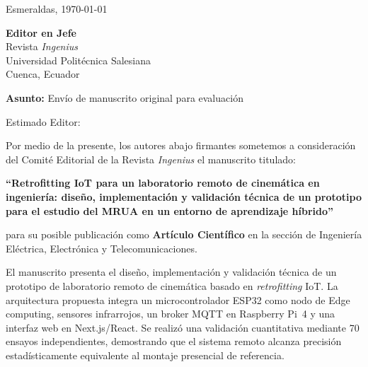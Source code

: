 \documentclass[12pt]{article}
\begin{document}
\begin{flushright}
Esmeraldas, \today
\end{flushright}

\vspace{1cm}

\noindent
\textbf{Editor en Jefe} \\
Revista \textit{Ingenius} \\
Universidad Polit\'ecnica Salesiana \\
Cuenca, Ecuador

\vspace{0.8cm}

\noindent
\textbf{Asunto:} Env\'io de manuscrito original para evaluaci\'on

\vspace{0.5cm}

\noindent Estimado Editor:

\vspace{0.3cm}

\noindent Por medio de la presente, los autores abajo firmantes sometemos a consideraci\'on del Comit\'e Editorial de la Revista \textit{Ingenius} el manuscrito titulado:

\vspace{0.3cm}

\begin{center}
\textbf{\large ``Retrofitting IoT para un laboratorio remoto de cinem\'atica en ingenier\'ia: dise\~no, implementaci\'on y validaci\'on t\'ecnica de un prototipo para el estudio del MRUA en un entorno de aprendizaje h\'ibrido''}
\end{center}

\vspace{0.3cm}

\noindent para su posible publicaci\'on como \textbf{Art\'iculo Cient\'ifico} en la secci\'on de Ingenier\'ia El\'ectrica, Electr\'onica y Telecomunicaciones.

\vspace{0.3cm}

\noindent El manuscrito presenta el dise\~no, implementaci\'on y validaci\'on t\'ecnica de un prototipo de laboratorio remoto de cinem\'atica basado en \textit{retrofitting} IoT. La arquitectura propuesta integra un microcontrolador ESP32 como nodo de Edge computing, sensores infrarrojos, un broker MQTT en Raspberry Pi~4 y una interfaz web en Next.js/React. Se realiz\'o una validaci\'on cuantitativa mediante 70 ensayos independientes, demostrando que el sistema remoto alcanza precisi\'on estad\'isticamente equivalente al montaje presencial de referencia.
\end{document}
